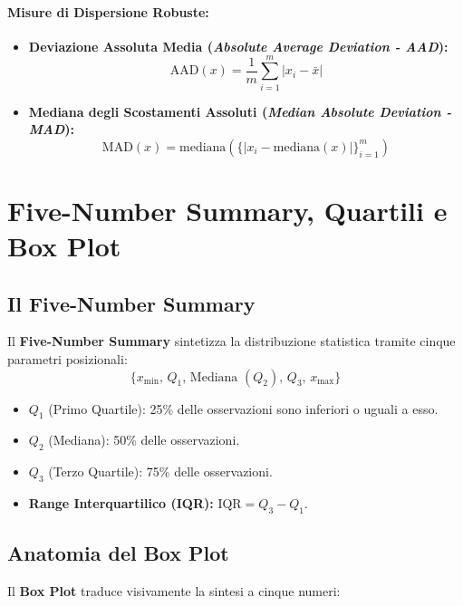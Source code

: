 \paragraph{Misure di Dispersione Robuste:}
\begin{itemize}
    \item \textbf{Deviazione Assoluta Media (\textit{Absolute Average Deviation - AAD}):}
    \begin{equation}
        \text{AAD}(x) = \frac{1}{m} \sum_{i=1}^m |x_i - \bar{x}|
    \end{equation}
    \item \textbf{Mediana degli Scostamenti Assoluti (\textit{Median Absolute Deviation - MAD}):}
    \begin{equation}
        \text{MAD}(x) = \text{mediana}\left(\Big\{|x_i - \text{mediana}(x)|\Big\}_{i=1}^m\right)
    \end{equation}
\end{itemize}

\FloatBarrier
\section{Five-Number Summary, Quartili e Box Plot}

\FloatBarrier
\subsection{Il Five-Number Summary}
Il \textbf{Five-Number Summary} sintetizza la distribuzione statistica tramite cinque parametri posizionali:
\begin{equation}
    \Big\{x_{\min},\, Q_1,\, \text{Mediana } (Q_2),\, Q_3,\, x_{\max}\Big\}
\end{equation}
\begin{itemize}
    \item $Q_1$ (Primo Quartile): 25\% delle osservazioni sono inferiori o uguali a esso.
    \item $Q_2$ (Mediana): 50\% delle osservazioni.
    \item $Q_3$ (Terzo Quartile): 75\% delle osservazioni.
    \item \textbf{Range Interquartilico (IQR):} $\text{IQR} = Q_3 - Q_1$.
\end{itemize}

\FloatBarrier
\subsection{Anatomia del Box Plot}
Il \textbf{Box Plot} traduce visivamente la sintesi a cinque numeri:

